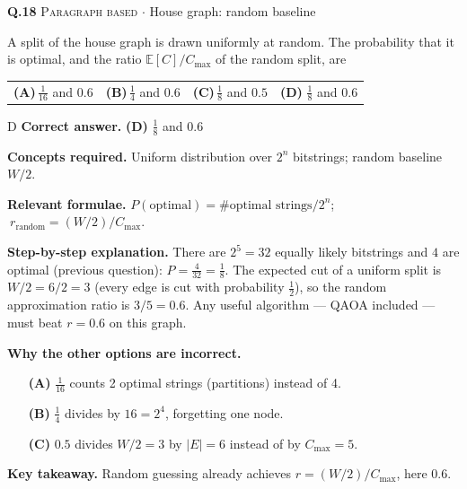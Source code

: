 \documentclass[11pt,a4paper]{article}
\newcommand{\optlabel}[1]{\textbf{(#1)}}
\newcommand{\correctlabel}[1]{\textcolor{okgreen}{\textbf{(#1)}\,\ding{51}}}
\newenvironment{qitem}[1]{\begin{list}{}{\setlength{\leftmargin}{3.3em}\setlength{\labelwidth}{3.1em}%
  \setlength{\labelsep}{0.2em}\setlength{\topsep}{3pt}\setlength{\parsep}{3pt}}\item[\textbf{Q.#1}\hfill]}{\end{list}}
\newcommand{\qsep}{\par\vspace{2pt}{\color{black!15}\hrule}\vspace{4pt}}
\newcommand{\qmeta}[2]{{\footnotesize\color{black!60}\textsc{#1} \;$\cdot$\; #2}\par}
\begin{document}
\qsep

\begin{qitem}{18}
\qmeta{Paragraph based}{House graph: random baseline}
A split of the house graph is drawn uniformly at random. The probability that it is optimal, and the ratio
$\mathbb{E}[C]/C_{\max}$ of the random split, are
\par\smallskip\noindent\begin{tabularx}{\linewidth}{@{}*{4}{L}@{}}
\optlabel{A}\,$\tfrac1{16}$ and $0.6$ & \optlabel{B}\,$\tfrac14$ and $0.6$ & \optlabel{C}\,$\tfrac18$ and $0.5$ & \correctlabel{D}\,$\tfrac18$ and $0.6$
\end{tabularx}
\end{qitem}
\begin{solbox}{D}
\textbf{\color{brand}Correct answer.} \textcolor{okgreen}{\textbf{(D)}} $\tfrac18$ and $0.6$

\textbf{\color{brand}Concepts required.} Uniform distribution over $2^n$ bitstrings; random baseline $W/2$.

\textbf{\color{brand}Relevant formulae.} $P(\text{optimal}) = \#\text{optimal strings}/2^n$; $\ r_{\text{random}} = (W/2)/C_{\max}$.

\textbf{\color{brand}Step-by-step explanation.} There are $2^5 = 32$ equally likely bitstrings and $4$ are optimal (previous question): $P = \tfrac{4}{32} = \tfrac18$.
The expected cut of a uniform split is $W/2 = 6/2 = 3$ (every edge is cut with probability $\tfrac12$), so the random
approximation ratio is $3/5 = 0.6$. Any useful algorithm --- QAOA included --- must beat $r = 0.6$ on this graph.

\textbf{\color{brand}Why the other options are incorrect.}
\begin{itemize}[leftmargin=2.4em, itemsep=1pt, topsep=2pt]
\item[\textbf{(A)}] $\frac1{16}$ counts 2 optimal strings (partitions) instead of 4.
\item[\textbf{(B)}] $\frac14$ divides by $16 = 2^4$, forgetting one node.
\item[\textbf{(C)}] $0.5$ divides $W/2 = 3$ by $|E| = 6$ instead of by $C_{\max} = 5$.
\end{itemize}
\textbf{\color{brand}Key takeaway.} Random guessing already achieves $r = (W/2)/C_{\max}$, here $0.6$.
\end{solbox}
\qsep
\end{document}
